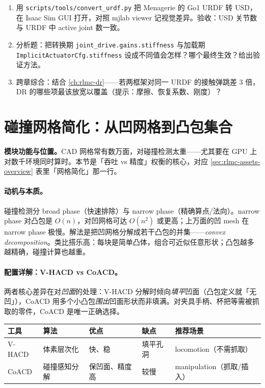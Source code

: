 \begin{practice}[动手：v2.x 转换与对照]
\begin{enumerate}
  \item 用 \texttt{scripts/\allowbreak tools/\allowbreak convert\_urdf.\allowbreak py} 把 Menagerie 的 Go1 URDF 转 USD，在 Isaac Sim GUI 打开，对照 mjlab viewer 记视觉差异。验收：USD 关节数与 URDF 中 active joint 数一致。
  \item 分析题：把转换期 \texttt{joint\_drive.\allowbreak gains.\allowbreak stiffness} 与加载期 \texttt{ImplicitActuatorCfg.\allowbreak stiffness} 设成不同值会怎样？哪个最终生效？给出验证方法。
  \item 跨章综合：结合 \cref{ch:rlmc-dr}——若两框架对同一 URDF 的接触弹跳差 3 倍，DR 的哪些项最该放宽以覆盖（提示：摩擦、恢复系数、刚度）？
\end{enumerate}
\end{practice}

\section{碰撞网格简化：从凹网格到凸包集合}
\label{sec:rlmc-assets-collision}

\textbf{模块功能与位置。}CAD 网格常有数万面，对碰撞检测太重——尤其要在 GPU 上对数千环境同时算时。本节是「吞吐 vs 精度」权衡的核心，对应 \cref{sec:rlmc-assets-overview} 表里「网格简化」那一行。

\paragraph{动机与本质。}碰撞检测分 broad phase（快速排除）与 narrow phase（精确算点/法向）。narrow phase 对凸包是 $O(n)$，对凹网格可达 $O(n^2)$ 或更高；上万面的凹 mesh 在 narrow phase 极慢。解法是把凹网格分解成若干凸包的并集——\emph{convex decomposition}。类比搭乐高：每块是简单凸体，组合可近似任意形状；凸包越多越精确，碰撞计算也越重。

\paragraph{配置详解：V-HACD vs CoACD。}两者核心差异在对\emph{凹面}的处理：V-HACD 分解时倾向\emph{填平}凹面（凸包定义就「无凹」），CoACD 用多个小凸包\emph{围出}凹面形状而非填满。对夹具手柄、杯把等需被抓取的零件，CoACD 是唯一正确选择。

\begin{center}
\small
\begin{tabular}{@{}lllll@{}}
\toprule
工具 & 算法 & 优点 & 缺点 & 推荐场景 \\
\midrule
V-HACD & 体素层次化 & 快、稳 & 填平孔洞 & locomotion（不需抓取） \\
CoACD & 碰撞感知分解 & 保凹面、精度高 & 较慢 & manipulation（抓取/插入） \\
\bottomrule
\end{tabular}
\end{center}

